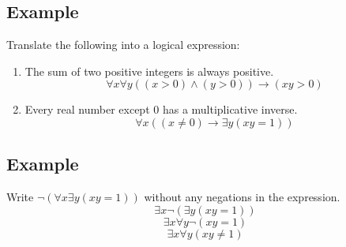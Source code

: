 \documentclass[letterpaper, 12pt]{math}
\begin{document}
\subsection*{Example}
Translate the following into a logical expression:
\begin{enumerate}
  \item The sum of two positive integers is always positive.
  \[ \forall{x}\forall{y}((x > 0) \wedge (y > 0)) \to (xy > 0) \]
  \item Every real number except 0 has a multiplicative inverse.
  \[ \forall{x}((x \neq 0) \to \exists{y}(xy = 1)) \]
\end{enumerate}

\subsection*{Example}
Write \( \neg{(\forall{x}\exists{y}(xy = 1))} \) without any negations
in the expression.
\[ \exists{x}\neg{(\exists{y}(xy=1))} \]
\[ \exists{x}\forall{y}\neg{(xy=1)} \]
\[ \exists{x}\forall{y}(xy \neq 1) \]
\end{document}
